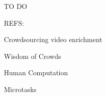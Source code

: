 TO DO


REFS:

Crowdsourcing video enrichment \cite{162960}

Wisdom of Crowds \cite{Howe2006,GALTON1907}

Human Computation \cite{vonAhn:2011:THC}

Microtasks \cite{Difallah:2015:DMC:2736277.2741685,Chen:2017:RIM:3025453.3025969}